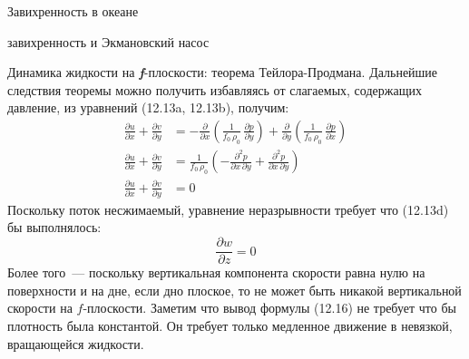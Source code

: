 \begin{chapter}{Завихренность в океане}
\begin{section}{завихренность и Экмановский насос}
\begin{paragraph}{Динамика жидкости на \textbf{\textit{f}}-плоскости: 
теорема Тейлора-Продмана.}
Дальнейшие следствия теоремы можно получить избавляясь от слагаемых,
содержащих давление, из уравнений (12.13a, 12.13b), получим:
\begin{subequations}
\begin{align}
\frac{\partial{u}}{\partial{x}} + \frac{\partial{v}}{\partial{y}} 
  &= -\frac{\partial }{\partial{x}} \left(\frac{1}{f_{0}\,\rho_{0}}\,
       \frac{\partial{p}}{\partial{y}} \right) 
     + \frac{\partial }{\partial{y}} \left(\frac{1}{f_{0}\,\rho_{0}}\,
       \frac{\partial{p}}{\partial{x}} \right) \\
\frac{\partial{u}}{\partial{x}} + \frac{\partial{v}}{\partial{y}} 
  &= \frac{1}{f_{0}\,\rho_{0}} 
       \left( -\frac{\partial ^2 p}{\partial{x}\,\partial{y}} 
              + \frac{\partial ^2 p}{\partial{x}\,\partial{y}} \right)  \\
\frac{\partial{u}}{\partial{x}} + \frac{\partial{v}}{\partial{y}} 
  &= 0
\end{align}
\end{subequations}
Поскольку поток несжимаемый, уравнение неразрывности требует что
(12.13d) бы выполнялось:
\begin{equation}
 \frac{\partial{w}}{\partial{z}} = 0
\end{equation}
Более того~--- поскольку вертикальная компонента скорости равна нулю
на поверхности и на дне, если дно плоское, то не может быть никакой
вертикальной скорости на $f$-плоскости. Заметим что вывод формулы
(12.16) не требует что бы плотность была константой. Он требует только
медленное движение в невязкой, вращающейся жидкости.
%

\end{paragraph}
\end{section}
\end{chapter}
